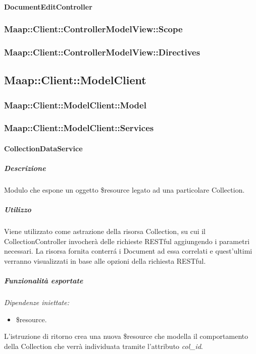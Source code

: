 \paragraph{DocumentEditController}


\subsubsection{Maap::Client::ControllerModelView::Scope}

\subsubsection{Maap::Client::ControllerModelView::Directives}

\subsection{Maap::Client::ModelClient}

\subsubsection{Maap::Client::ModelClient::Model}

\subsubsection{Maap::Client::ModelClient::Services}

\paragraph{CollectionDataService}
\subparagraph{Descrizione}
Modulo che espone un oggetto \$resource legato ad una particolare Collection. 

\subparagraph{Utilizzo}
Viene utilizzato come astrazione della risorsa Collection, su cui il CollectionController invocherà delle richieste 
RESTful aggiungendo i parametri necessari. La risorsa fornita conterr\'{a} i Document ad essa correlati e quest'ultimi 
verranno visualizzati in base alle opzioni della richiesta RESTful.

\subparagraph{Funzionalità esportate}
\emph{Dipendenze iniettate:}
\begin{itemize}
 \item \$resource.
\end{itemize}
L'istruzione di ritorno crea una nuova \$resource che modella il comportamento della Collection 
che verrà individuata tramite l'attributo \emph{col_id}.


